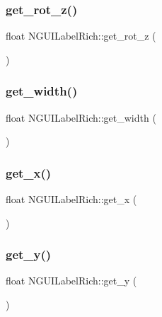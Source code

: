 \subsubsection{\texorpdfstring{get\+\_\+rot\+\_\+z()}{get\_rot\_z()}}
{\footnotesize\ttfamily float N\+G\+U\+I\+Label\+Rich\+::get\+\_\+rot\+\_\+z (\begin{DoxyParamCaption}{ }\end{DoxyParamCaption})}

\hypertarget{class_n_g_u_i_label_rich_af5937b7f05ed4754cc508db913394e12}{}\label{class_n_g_u_i_label_rich_af5937b7f05ed4754cc508db913394e12} 
\subsubsection{\texorpdfstring{get\+\_\+width()}{get\_width()}}
{\footnotesize\ttfamily float N\+G\+U\+I\+Label\+Rich\+::get\+\_\+width (\begin{DoxyParamCaption}{ }\end{DoxyParamCaption})}

\hypertarget{class_n_g_u_i_label_rich_ab3d887c70166b744284183d2cc1d5e22}{}\label{class_n_g_u_i_label_rich_ab3d887c70166b744284183d2cc1d5e22} 
\subsubsection{\texorpdfstring{get\+\_\+x()}{get\_x()}}
{\footnotesize\ttfamily float N\+G\+U\+I\+Label\+Rich\+::get\+\_\+x (\begin{DoxyParamCaption}{ }\end{DoxyParamCaption})}

\hypertarget{class_n_g_u_i_label_rich_a76221951037b451754768e603d4bce98}{}\label{class_n_g_u_i_label_rich_a76221951037b451754768e603d4bce98} 
\subsubsection{\texorpdfstring{get\+\_\+y()}{get\_y()}}
{\footnotesize\ttfamily float N\+G\+U\+I\+Label\+Rich\+::get\+\_\+y (\begin{DoxyParamCaption}{ }\end{DoxyParamCaption})}

